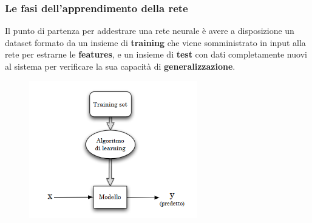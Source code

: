 \documentclass{beamer}
\begin{document}
\begin{frame}
	\frametitle{Le fasi dell'apprendimento della rete}
	Il punto di partenza per  addestrare  una  rete  neurale è avere a disposizione un dataset 
	formato da un insieme di \textbf{training} che viene somministrato in input alla rete per estrarne le \textbf{features},
	 e un insieme di \textbf{test} con dati completamente nuovi al sistema per verificare 
	 la sua capacità di \textbf{generalizzazione}.
	
	 \begin{figure}
		 \includegraphics[width=0.65\textwidth]{schema apprendimento supervisionato.PNG}
		 
	 \end{figure}	
	
\end{frame}
\end{document}
